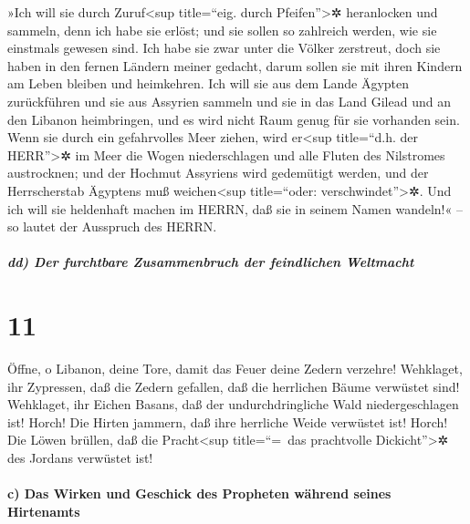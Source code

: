  »Ich will sie durch Zuruf\textless sup title=``eig. durch
Pfeifen''\textgreater✲ heranlocken und sammeln, denn ich habe sie
erlöst; und sie sollen so zahlreich werden, wie sie einstmals gewesen
sind.  Ich habe sie zwar unter die Völker zerstreut, doch
sie haben in den fernen Ländern meiner gedacht, darum sollen sie mit
ihren Kindern am Leben bleiben und heimkehren.  Ich will
sie aus dem Lande Ägypten zurückführen und sie aus Assyrien sammeln und
sie in das Land Gilead und an den Libanon heimbringen, und es wird nicht
Raum genug für sie vorhanden sein.  Wenn sie durch ein
gefahrvolles Meer ziehen, wird er\textless sup title=``d.h. der
HERR''\textgreater✲ im Meer die Wogen niederschlagen und alle Fluten des
Nilstromes austrocknen; und der Hochmut Assyriens wird gedemütigt
werden, und der Herrscherstab Ägyptens muß weichen\textless sup
title=``oder: verschwindet''\textgreater✲.  Und ich will
sie heldenhaft machen im HERRN, daß sie in seinem Namen wandeln!« -- so
lautet der Ausspruch des HERRN.

\hypertarget{dd-der-furchtbare-zusammenbruch-der-feindlichen-weltmacht}{%
\subparagraph{dd) Der furchtbare Zusammenbruch der feindlichen
Weltmacht}\label{dd-der-furchtbare-zusammenbruch-der-feindlichen-weltmacht}}

\hypertarget{section-10}{%
\section{11}\label{section-10}}

 Öffne, o Libanon, deine Tore, damit das Feuer deine
Zedern verzehre!  Wehklaget, ihr Zypressen, daß die Zedern
gefallen, daß die herrlichen Bäume verwüstet sind! Wehklaget, ihr Eichen
Basans, daß der undurchdringliche Wald niedergeschlagen ist!
 Horch! Die Hirten jammern, daß ihre herrliche Weide
verwüstet ist! Horch! Die Löwen brüllen, daß die Pracht\textless sup
title=``=~das prachtvolle Dickicht''\textgreater✲ des Jordans verwüstet
ist!

\hypertarget{c-das-wirken-und-geschick-des-propheten-wuxe4hrend-seines-hirtenamts}{%
\paragraph{c) Das Wirken und Geschick des Propheten während seines
Hirtenamts}\label{c-das-wirken-und-geschick-des-propheten-wuxe4hrend-seines-hirtenamts}}

